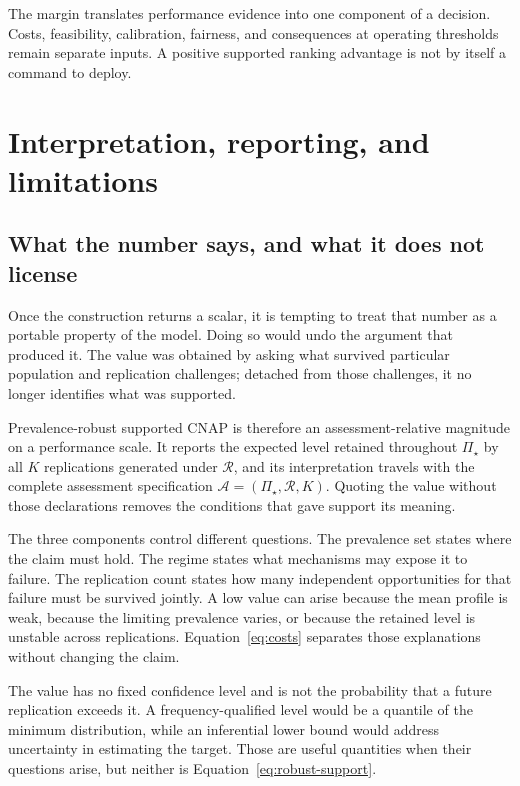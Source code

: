 \documentclass[11pt]{article}
\newcommand{\Regime}{\mathcal{R}}
\newcommand{\Assess}{\mathcal{A}}
\newcommand{\PSet}{\Pi_\star}
\theoremstyle{remark}
\begin{document}
The margin translates performance evidence into one component of a decision. Costs, feasibility, calibration, fairness, and consequences at operating thresholds remain separate inputs. A positive supported ranking advantage is not by itself a command to deploy.

\section{Interpretation, reporting, and limitations}
\label{sec:discussion}

\subsection{What the number says, and what it does not license}

Once the construction returns a scalar, it is tempting to treat that number as a portable property of the model. Doing so would undo the argument that produced it. The value was obtained by asking what survived particular population and replication challenges; detached from those challenges, it no longer identifies what was supported.

Prevalence-robust supported CNAP is therefore an assessment-relative magnitude on a performance scale. It reports the expected level retained throughout $\PSet$ by all $K$ replications generated under $\Regime$, and its interpretation travels with the complete assessment specification $\Assess=(\PSet,\Regime,K)$. Quoting the value without those declarations removes the conditions that gave support its meaning.

The three components control different questions. The prevalence set states where the claim must hold. The regime states what mechanisms may expose it to failure. The replication count states how many independent opportunities for that failure must be survived jointly. A low value can arise because the mean profile is weak, because the limiting prevalence varies, or because the retained level is unstable across replications. Equation~\eqref{eq:costs} separates those explanations without changing the claim.

The value has no fixed confidence level and is not the probability that a future replication exceeds it. A frequency-qualified level would be a quantile of the minimum distribution, while an inferential lower bound would address uncertainty in estimating the target. Those are useful quantities when their questions arise, but neither is Equation~\eqref{eq:robust-support}.
\end{document}
